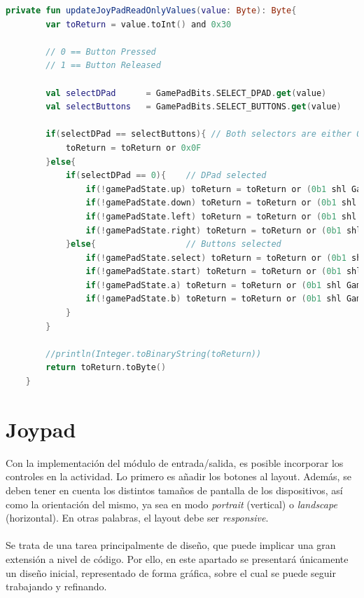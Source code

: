 \begin{lstlisting}[language=Kotlin, caption={Escritura de los Estados de los Botones del Joypad}, label={code:iojoypadwrite}]
    private fun updateJoyPadReadOnlyValues(value: Byte): Byte{
        var toReturn = value.toInt() and 0x30

        // 0 == Button Pressed
        // 1 == Button Released

        val selectDPad      = GamePadBits.SELECT_DPAD.get(value)
        val selectButtons   = GamePadBits.SELECT_BUTTONS.get(value)

        if(selectDPad == selectButtons){ // Both selectors are either 0 or 1
            toReturn = toReturn or 0x0F
        }else{
            if(selectDPad == 0){    // DPad selected
                if(!gamePadState.up) toReturn = toReturn or (0b1 shl GamePadBits.UP_PAD.bit)
                if(!gamePadState.down) toReturn = toReturn or (0b1 shl GamePadBits.DOWN_PAD.bit)
                if(!gamePadState.left) toReturn = toReturn or (0b1 shl GamePadBits.LEFT_PAD.bit)
                if(!gamePadState.right) toReturn = toReturn or (0b1 shl GamePadBits.RIGHT_PAD.bit)
            }else{                  // Buttons selected
                if(!gamePadState.select) toReturn = toReturn or (0b1 shl GamePadBits.SELECT_BUTTON.bit)
                if(!gamePadState.start) toReturn = toReturn or (0b1 shl GamePadBits.START_BUTTON.bit)
                if(!gamePadState.a) toReturn = toReturn or (0b1 shl GamePadBits.A_BUTTON.bit)
                if(!gamePadState.b) toReturn = toReturn or (0b1 shl GamePadBits.B_BUTTON.bit)
            }
        }

        //println(Integer.toBinaryString(toReturn))
        return toReturn.toByte()
    }
\end{lstlisting}

\section{Joypad}

Con la implementación del módulo de entrada/salida, es posible incorporar los controles en la actividad. Lo primero es añadir los botones al layout. Además, se deben tener en cuenta los distintos tamaños de pantalla de los dispositivos, así como la orientación del mismo, ya sea en modo \textit{portrait} (vertical) o \textit{landscape} (horizontal). En otras palabras, el layout debe ser \textit{responsive}.
\\\\
Se trata de una tarea principalmente de diseño, que puede implicar una gran extensión a nivel de código. Por ello, en este apartado se presentará únicamente un diseño inicial, representado de forma gráfica, sobre el cual se puede seguir trabajando y refinando.

